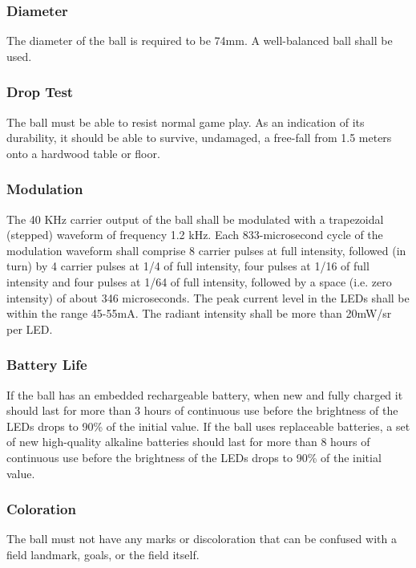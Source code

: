 \documentclass{article}
\begin{document}
\subsubsection{Diameter}

The diameter of the ball is required to be 74mm. A well-balanced ball shall be
used.

\subsubsection{Drop Test}

The ball must be able to resist normal game play. As an indication of its
durability, it should be able to survive, undamaged, a free-fall from 1.5
meters onto a hardwood table or floor.

\subsubsection{Modulation}

The 40 KHz carrier output of the ball shall be modulated with a trapezoidal
(stepped) waveform of frequency 1.2 kHz. Each 833-microsecond cycle of the
modulation waveform shall comprise 8 carrier pulses at full intensity, followed
(in turn) by 4 carrier pulses at 1/4 of full intensity, four pulses at 1/16 of
full intensity and four pulses at 1/64 of full intensity, followed by a space
(i.e. zero intensity) of about 346 microseconds. The peak current level in the
LEDs shall be within the range 45-55mA. The radiant intensity shall be more
than 20mW/sr per LED.

\subsubsection{Battery Life}

If the ball has an embedded rechargeable battery, when new and fully charged it
should last for more than 3 hours of continuous use before the brightness of
the LEDs drops to 90\% of the initial value. If the ball uses replaceable
batteries, a set of new high-quality alkaline batteries should last for more
than 8 hours of continuous use before the brightness of the LEDs drops to 90\%
of the initial value.

\subsubsection{Coloration}

The ball must not have any marks or discoloration that can be confused with a field
landmark, goals, or the field itself.
\end{document}
